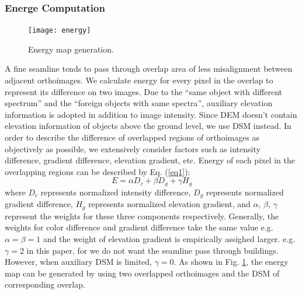 \documentclass[journal]{IEEEtran}
\begin{document}
\subsubsection{Energe Computation}
\begin{figure}[!t]
	\centering
	\texttt{[image: energy]}
	\caption{Energy map generation.}
	\label{fig:energymap}
\end{figure}
A fine seamline tends to pass through overlap area of less misalignment between adjacent orthoimages. We calculate energy for every pixel in the overlap to represent its difference on two images. Due to the ``same object with different spectrum'' and the ``foreign objects with same spectra'', auxiliary elevation information is adopted in addition to image intensity. Since DEM doesn't contain elevation information of objects above the ground level, we use DSM instead. In order to describe the difference of overlapped regions of orthoimages as objectively as possible, we extensively consider factors such as intensity difference, gradient difference, elevation gradient, etc. Energy of each pixel in the overlapping regions can be described by Eq. (\ref{eq1}):
\begin{equation}\label{eq1}
E=\alpha D_{c}+\beta D_{g}+\gamma H_{g}
\end{equation}
where $D_{c}$ represents normalized intensity difference, $D_{g}$ represents normalized gradient difference, $H_{g}$ represents normalized elevation gradient, and $\alpha$, $\beta$, $\gamma$ represent the weights for these three components respectively. Generally, the weights for color difference and gradient difference take the same value e.g. $\alpha = \beta = 1$ and the weight of elevation gradient is empirically assighed larger. e.g. $\gamma = 2$ in this paper, for we do not want the seamline pass through buildings. However, when auxiliary DSM is limited, $\gamma = 0$. As shown in Fig. \ref{fig:energymap}, the energy map can be generated by using two overlapped orthoimages and the DSM of corresponding overlap.
\end{document}
